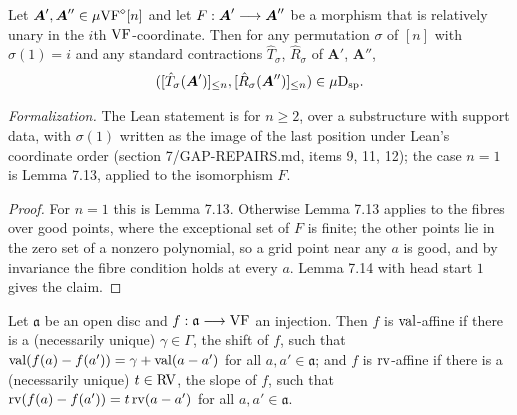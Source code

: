\setcounter{theorem}{14}
\begin{corollary}
\label{contraction-same-perm-isp}
\leanok
{}
Let $\boldsymbol{A}', \boldsymbol{A}'' \in \mu\mathrm{VF}^\diamond[n]$ and let $F : \boldsymbol{A}' \longrightarrow \boldsymbol{A}''$ be a morphism that is relatively unary in the $i$th $\mathrm{VF}$-coordinate. Then for any permutation $\sigma$ of $[n]$ with $\sigma(1) = i$ and any standard contractions $\hat T_\sigma$, $\hat R_\sigma$ of $\boldsymbol{A}'$, $\boldsymbol{A}''$,\[ ([\hat T_\sigma(\boldsymbol{A}')]_{\leq n}, [\hat R_\sigma(\boldsymbol{A}'')]_{\leq n}) \in \mu\mathrm{D}_{\mathrm{sp}}. \]

\emph{Formalization.} The Lean statement is for $n \geq 2$, over a substructure with support data, with $\sigma(1)$ written as the image of the last position under Lean's coordinate order (section 7/GAP-REPAIRS.md, items 9, 11, 12); the case $n = 1$ is Lemma 7.13, applied to the isomorphism $F$.
\end{corollary}

\begin{proof}
\leanok
For $n = 1$ this is Lemma 7.13. Otherwise Lemma 7.13 applies to the fibres over good points, where the exceptional set of $F$ is finite; the other points lie in the zero set of a nonzero polynomial, so a grid point near any $a$ is good, and by invariance the fibre condition holds at every $a$. Lemma 7.14 with head start $1$ gives the claim.
\end{proof}

\setcounter{theorem}{15}
\begin{definition}
\label{rvaffine}
\leanok
Let $\mathfrak{a}$ be an open disc and $f : \mathfrak{a} \longrightarrow \mathrm{VF}$ an injection. Then $f$ is $\operatorname{val}$-affine if there is a (necessarily unique) $\gamma \in \Gamma$, the shift of $f$, such that $\operatorname{val}(f(a) - f(a')) = \gamma + \operatorname{val}(a - a')$ for all $a, a' \in \mathfrak{a}$; and $f$ is $\operatorname{rv}$-affine if there is a (necessarily unique) $t \in \mathrm{RV}$, the slope of $f$, such that $\operatorname{rv}(f(a) - f(a')) = t \operatorname{rv}(a - a')$ for all $a, a' \in \mathfrak{a}$.
\end{definition}

